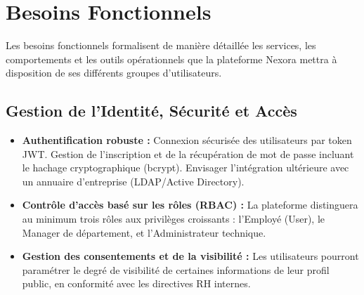 \documentclass[12pt,a4paper]{article}
\begin{document}
\section{Besoins Fonctionnels}

Les besoins fonctionnels formalisent de manière détaillée les services, les comportements et les outils opérationnels que la plateforme Nexora mettra à disposition de ses différents groupes d'utilisateurs.

\subsection{Gestion de l'Identité, Sécurité et Accès}
\begin{itemize}[leftmargin=*]
    \item \textbf{Authentification robuste :} Connexion sécurisée des utilisateurs par token JWT. Gestion de l'inscription et de la récupération de mot de passe incluant le hachage cryptographique (bcrypt). Envisager l'intégration ultérieure avec un annuaire d'entreprise (LDAP/Active Directory).
    \item \textbf{Contrôle d'accès basé sur les rôles (RBAC) :} La plateforme distinguera au minimum trois rôles aux privilèges croissants : l'Employé (User), le Manager de département, et l'Administrateur technique.
    \item \textbf{Gestion des consentements et de la visibilité :} Les utilisateurs pourront paramétrer le degré de visibilité de certaines informations de leur profil public, en conformité avec les directives RH internes.
\end{itemize}
\end{document}
